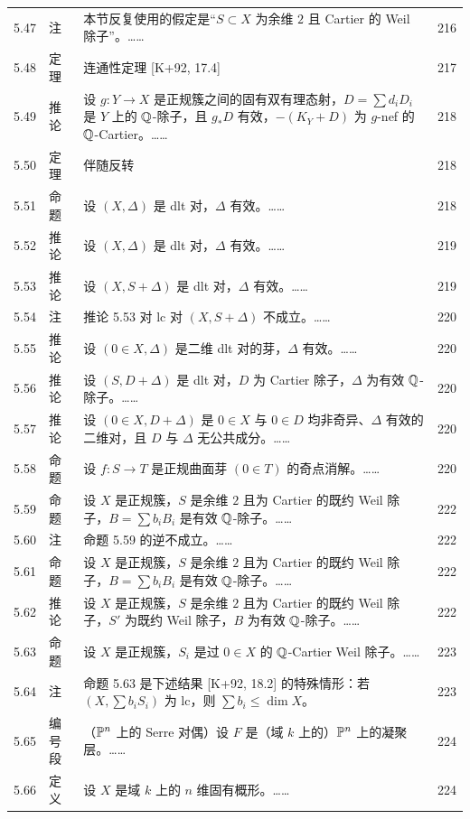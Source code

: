 \begin{longtable}{@{}p{}p{}p{}p{}@{}}
5.47 & 注 & 本节反复使用的假定是“$S\subset X$ 为余维 $2$ 且 Cartier 的 Weil 除子”。…… & 216 \\
5.48 & 定理 & 连通性定理 [K+92, 17.4] & 217 \\
5.49 & 推论 & 设 $g\colon Y\to X$ 是正规簇之间的固有双有理态射，$D=\sum d_iD_i$ 是 $Y$ 上的 $\mathbb{Q}$-除子，且 $g_*D$ 有效，$-(K_Y+D)$ 为 $g$-nef 的 $\mathbb{Q}$-Cartier。…… & 218 \\
5.50 & 定理 & 伴随反转 & 218 \\
5.51 & 命题 & 设 $(X,\Delta)$ 是 dlt 对，$\Delta$ 有效。…… & 218 \\
5.52 & 推论 & 设 $(X,\Delta)$ 是 dlt 对，$\Delta$ 有效。…… & 219 \\
5.53 & 推论 & 设 $(X,S+\Delta)$ 是 dlt 对，$\Delta$ 有效。…… & 219 \\
5.54 & 注 & 推论 5.53 对 lc 对 $(X,S+\Delta)$ 不成立。…… & 220 \\
5.55 & 推论 & 设 $(0\in X,\Delta)$ 是二维 dlt 对的芽，$\Delta$ 有效。…… & 220 \\
5.56 & 推论 & 设 $(S,D+\Delta)$ 是 dlt 对，$D$ 为 Cartier 除子，$\Delta$ 为有效 $\mathbb{Q}$-除子。…… & 220 \\
5.57 & 推论 & 设 $(0\in X,D+\Delta)$ 是 $0\in X$ 与 $0\in D$ 均非奇异、$\Delta$ 有效的二维对，且 $D$ 与 $\Delta$ 无公共成分。…… & 220 \\
5.58 & 命题 & 设 $f\colon S\to T$ 是正规曲面芽 $(0\in T)$ 的奇点消解。…… & 220 \\
5.59 & 命题 & 设 $X$ 是正规簇，$S$ 是余维 $2$ 且为 Cartier 的既约 Weil 除子，$B=\sum b_iB_i$ 是有效 $\mathbb{Q}$-除子。…… & 222 \\
5.60 & 注 & 命题 5.59 的逆不成立。…… & 222 \\
5.61 & 命题 & 设 $X$ 是正规簇，$S$ 是余维 $2$ 且为 Cartier 的既约 Weil 除子，$B=\sum b_iB_i$ 是有效 $\mathbb{Q}$-除子。…… & 222 \\
5.62 & 推论 & 设 $X$ 是正规簇，$S$ 是余维 $2$ 且为 Cartier 的既约 Weil 除子，$S'$ 为既约 Weil 除子，$B$ 为有效 $\mathbb{Q}$-除子。…… & 222 \\
5.63 & 命题 & 设 $X$ 是正规簇，$S_i$ 是过 $0\in X$ 的 $\mathbb{Q}$-Cartier Weil 除子。…… & 223 \\
5.64 & 注 & 命题 5.63 是下述结果 [K+92, 18.2] 的特殊情形：若 $(X,\sum b_iS_i)$ 为 lc，则 $\sum b_i\le\dim X$。 & 223 \\
5.65 & 编号段 & （$\mathbb{P}^n$ 上的 Serre 对偶）\quad 设 $F$ 是（域 $k$ 上的）$\mathbb{P}^n$ 上的凝聚层。…… & 224 \\
5.66 & 定义 & 设 $X$ 是域 $k$ 上的 $n$ 维固有概形。…… & 224 \\

\end{longtable}
